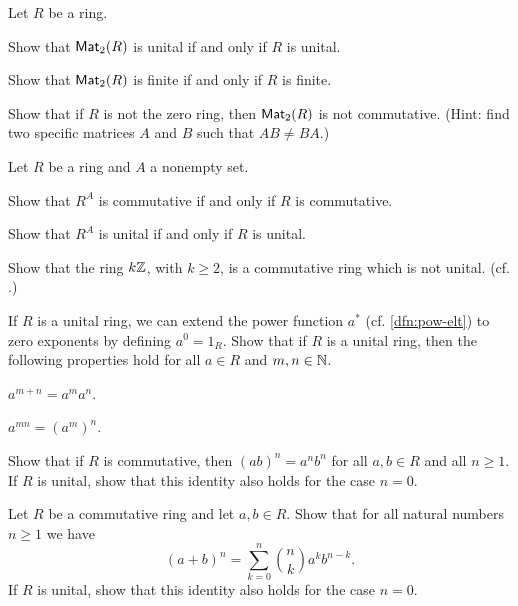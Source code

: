 \begin{exercise}
Let \(R\) be a ring.
\begin{proplist}
\item Show that \(\mathsf{Mat}_{2}(R)\) is unital if and only if \(R\) is unital.
\item Show that \(\mathsf{Mat}_{2}(R)\) is finite if and only if \(R\) is finite.
\item Show that if \(R\) is not the zero ring, then \(\mathsf{Mat}_{2}(R)\) is not commutative.
(Hint: find two specific matrices \(A\) and \(B\) such that \(AB \neq BA\).)
\end{proplist}
\end{exercise}


\begin{exercise}
Let \(R\) be a ring and \(A\) a nonempty set.
\begin{proplist}
\item Show that \(R^A\) is commutative if and only if \(R\) is commutative.
\item Show that \(R^A\) is unital if and only if \(R\) is unital.
\end{proplist}
\end{exercise}

\begin{exercise}
Show that the ring \(k\mathbb{Z}\), with \(k \geq 2\), is a commutative ring which is not unital.
(cf. .)
\end{exercise}


\begin{exercise}
If \(R\) is a unital ring, we can extend the power function \(a^\ast\) (cf. \ref{dfn:pow-elt}) to zero exponents by defining \(a^0 = 1_R\).
Show that if \(R\) is a unital ring, then the following properties hold for all \(a \in R\) and \(m,n \in \mathbb{N}\).
\begin{proplist*}
\item \(a^{m+n} = a^m a^n\).
\item \(a^{mn} = (a^m)^n\).
\end{proplist*}
\end{exercise}


\begin{exercise}
Show that if \(R\) is commutative, then \((ab)^n = a^n b^n\) for all \(a,b \in R\) and all \(n \geq 1\).
If \(R\) is unital, show that this identity also holds for the case \(n = 0\).
\end{exercise}


\begin{exercise} \label{exerc:binomial-theorem}
Let \(R\) be a commutative ring and let \(a,b \in R\).
Show that for all natural numbers \(n \geq 1\) we have \[ (a+b)^n = \sum_{k=0}^n {n \choose k} a^k b^{n-k}. \]
If \(R\) is unital, show that this identity also holds for the case \(n = 0\).
\end{exercise}


